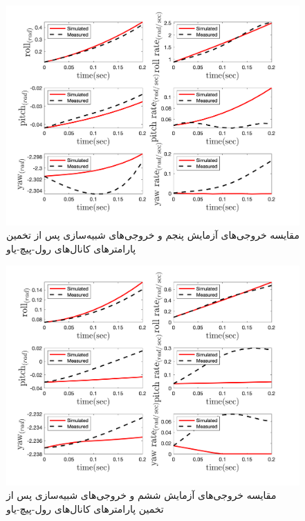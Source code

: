 \begin{figure}[H]
	\includegraphics[width=12cm]{../../Figures/RCP/roll_pitch_yaw_parameter_estimation/RCP_roll_pitch_yaw_S6.png}
	\centering
	\caption{مقايسه خروجی‌های آزمايش پنجم و خروجی‌های شبیه‌سازی پس از تخمین پارامترهای کانال‌های رول-پیچ-یاو}
	\label{ roll_pitch_yaw_ps5}
\end{figure}
\begin{figure}[H]
	\includegraphics[width=12cm]{../../Figures/RCP/roll_pitch_yaw_parameter_estimation/RCP_roll_pitch_yaw_S7.png}
	\centering
	\caption{مقايسه خروجی‌های آزمايش ششم و خروجی‌های شبیه‌سازی پس از تخمین پارامترهای کانال‌های رول-پیچ-یاو}
	\label{ roll_pitch_yaw_ps6}
\end{figure}
